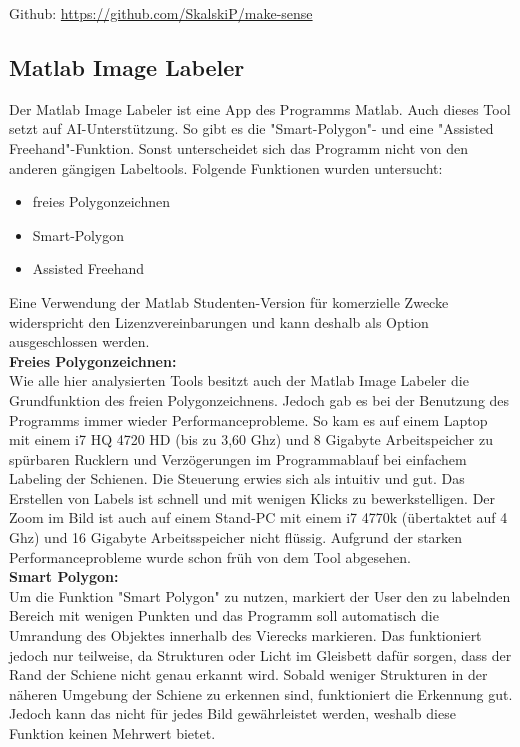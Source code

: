 \documentclass[11pt]{scrartcl}
\begin{document}
\noindent
Github: \url{https://github.com/SkalskiP/make-sense} 
\subsection{Matlab Image Labeler}
\label{sec:Matlab Image Labeler}

Der Matlab Image Labeler ist eine App des Programms Matlab. Auch dieses Tool setzt auf AI-Unterstützung. So gibt es die "Smart-Polygon"- und eine "Assisted Freehand"-Funktion. Sonst unterscheidet sich das Programm nicht von den anderen gängigen Labeltools. Folgende Funktionen wurden untersucht:
\begin{itemize}
	\item freies Polygonzeichnen
	\item Smart-Polygon
	\item Assisted Freehand
\end{itemize}
Eine Verwendung der Matlab Studenten-Version für komerzielle Zwecke widerspricht den Lizenzvereinbarungen und kann deshalb als Option ausgeschlossen werden.
\\

 \noindent
\textbf{Freies Polygonzeichnen:}
\\

\noindent
Wie alle hier analysierten Tools besitzt auch der Matlab Image Labeler die Grundfunktion des freien Polygonzeichnens. Jedoch gab es bei der Benutzung des Programms immer wieder Performanceprobleme. So kam es auf einem Laptop mit einem i7 HQ 4720 HD (bis zu 3,60 Ghz) und 8 Gigabyte Arbeitspeicher zu spürbaren Rucklern und Verzögerungen im Programmablauf bei einfachem Labeling der Schienen. Die Steuerung erwies sich als intuitiv und gut. Das Erstellen von Labels ist schnell und mit wenigen Klicks zu bewerkstelligen. Der Zoom im Bild ist auch auf einem Stand-PC mit einem i7 4770k (übertaktet auf 4 Ghz) und 16 Gigabyte Arbeitsspeicher nicht flüssig. Aufgrund der starken Performanceprobleme wurde schon früh von dem Tool abgesehen.
\\

\noindent
\textbf{Smart Polygon:}
\\

\noindent
Um die Funktion "Smart Polygon" zu nutzen, markiert der User den zu labelnden Bereich mit wenigen Punkten und das Programm soll automatisch die Umrandung des Objektes innerhalb des Vierecks markieren. Das funktioniert jedoch nur teilweise, da Strukturen oder Licht im Gleisbett dafür sorgen, dass der Rand der Schiene nicht genau erkannt wird. Sobald weniger Strukturen in der näheren Umgebung der Schiene zu erkennen sind, funktioniert die Erkennung gut. Jedoch kann das nicht für jedes Bild gewährleistet werden, weshalb diese Funktion keinen Mehrwert bietet.
\end{document}
